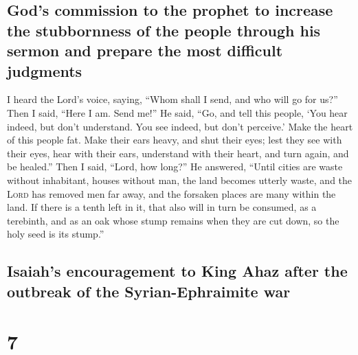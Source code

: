 \hypertarget{gods-commission-to-the-prophet-to-increase-the-stubbornness-of-the-people-through-his-sermon-and-prepare-the-most-difficult-judgments}{%
\subsection{God's commission to the prophet to increase the stubbornness
of the people through his sermon and prepare the most difficult
judgments}\label{gods-commission-to-the-prophet-to-increase-the-stubbornness-of-the-people-through-his-sermon-and-prepare-the-most-difficult-judgments}}

 I heard the Lord's voice, saying, ``Whom shall I send,
and who will go for us?'' Then I said, ``Here I am. Send me!''
 He said, ``Go, and tell this people, `You hear indeed,
but don't understand. You see indeed, but don't perceive.'
 Make the heart of this people fat. Make their ears
heavy, and shut their eyes; lest they see with their eyes, hear with
their ears, understand with their heart, and turn again, and be
healed.''  Then I said, ``Lord, how long?'' He answered,
``Until cities are waste without inhabitant, houses without man, the
land becomes utterly waste,  and the \textsc{Lord} has
removed men far away, and the forsaken places are many within the land.
 If there is a tenth left in it, that also will in turn
be consumed, as a terebinth, and as an oak whose stump remains when they
are cut down, so the holy seed is its stump.''

\hypertarget{isaiahs-encouragement-to-king-ahaz-after-the-outbreak-of-the-syrian-ephraimite-war}{%
\subsection{Isaiah's encouragement to King Ahaz after the outbreak of
the Syrian-Ephraimite
war}\label{isaiahs-encouragement-to-king-ahaz-after-the-outbreak-of-the-syrian-ephraimite-war}}

\hypertarget{section-6}{%
\section{7}\label{section-6}}


